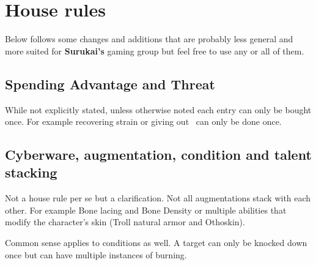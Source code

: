 \documentclass{book}
\begin{document}
\section{House rules}
\begin{multicols}{2} Below follows some changes and additions that are probably less general and more suited for \textbf{Surukai's} gaming group but feel free to use any or all of them.

\subsection{Spending Advantage and Threat}
While not explicitly stated, unless otherwise noted each entry can only be bought once. For example recovering strain or giving out \BoostDie\ can only be done once. 

\subsection{Cyberware, augmentation, condition and talent stacking}
Not a house rule per se but a clarification. Not all augmentations stack with each other. For example Bone lacing and Bone Density or multiple abilities that modify the character's skin (Troll natural armor and Othoskin). 

Common sense applies to conditions as well. A target can only be knocked down once but can have multiple instances of burning.






\end{multicols}
\end{document}
